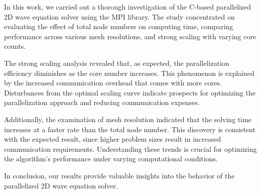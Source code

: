 \documentclass{article}
\begin{document}
In this work, we carried out a thorough investigation of the C-based parallelized 2D wave equation solver using the MPI library. The study concentrated on evaluating the effect of total node numbers on computing time, comparing performance across various mesh resolutions, and strong scaling with varying core counts.

The strong scaling analysis revealed that, as expected, the parallelization efficiency diminishes as the core number increases. This phenomenon is explained by the increased communication overhead that comes with more cores. Disturbances from the optimal scaling curve indicate prospects for optimizing the parallelization approach and reducing communication expenses.

Additionally, the examination of mesh resolution indicated that the solving time increases at a faster rate than the total node number. This discovery is consistent with the expected result, since higher problem sizes result in increased communication requirements. Understanding these trends is crucial for optimizing the algorithm's performance under varying computational conditions.

In conclusion, our results provide valuable insights into the behavior of the parallelized 2D wave equation solver. 


\printbibliography
\end{document}
